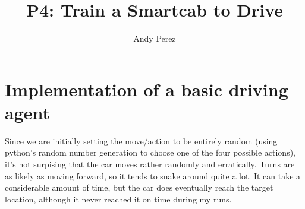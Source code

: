 \documentclass{amsart}
\begin{document}
\title{P4: Train a Smartcab to Drive}
\author{Andy Perez}
\maketitle
\section{Implementation of a basic driving agent}
Since we are initially setting the move/action to be entirely random (using python's random number generation to choose one of the four possible actions), it's not surpising that the car moves
rather randomly and erratically.  Turns are as likely as moving forward, so it tends to snake around quite a lot.  It can take a considerable amount of time, but the car does eventually reach the target location, although it never reached it on time during my runs.
\end{document}
